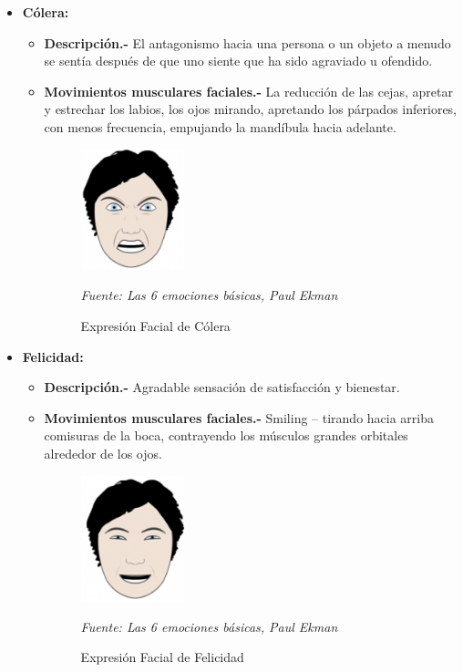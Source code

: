 \begin{itemize}
\item {\textbf{Cólera:} 
\begin{itemize}
\item \textbf{Descripción.-} El antagonismo hacia una persona o un objeto a menudo se sentía después de que uno siente que ha sido agraviado u ofendido.
\item { \textbf{Movimientos musculares faciales.-} La reducción de las cejas, apretar y estrechar los labios, los ojos mirando, apretando los párpados inferiores, con menos frecuencia, empujando la mandíbula hacia adelante.

\begin{figure}[H]
		\centering
		\includegraphics[width=30mm]{./Imagenes/colera.png}
		\caption{Expresión Facial de Cólera}
		\vspace{0.15cm}
		\textit{Fuente: Las 6 emociones básicas, Paul Ekman}
		\label{fig:colera}
\end{figure}}
\end{itemize}}



\item {\textbf{Felicidad:} 
\begin{itemize}
\item \textbf{Descripción.-} Agradable sensación de satisfacción y bienestar.
\item { \textbf{Movimientos musculares faciales.-} Smiling – tirando hacia arriba comisuras de la boca, contrayendo los músculos grandes orbitales alrededor de los ojos.

\begin{figure}[H]
		\centering
		\includegraphics[width=30mm]{./Imagenes/felicidad.png}
		\caption{Expresión Facial de Felicidad}
		\vspace{0.15cm}
		\textit{Fuente: Las 6 emociones básicas, Paul Ekman}
		\label{fig:felicidad}
\end{figure}}
\end{itemize}}




\end{itemize}
